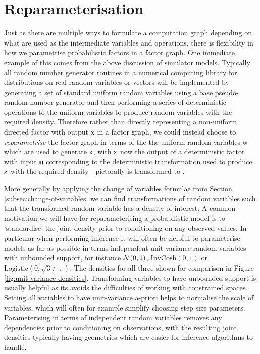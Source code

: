 \chapter{\mbox{Reparameterisation}}\label{ch:reparameterisation}

Just as there are multiple ways to formulate a computation graph depending on what are used as the intermediate variables and operations, there is flexibility in how we parametrise probabilistic factors in a factor graph. One immediate example of this comes from the above discussion of simulator models. Typically all random number generator routines in a numerical computing library for distributions on real random variables or vectors will be implemented by generating a set of standard uniform random variables using a base pseudo-random number generator and then performing a series of deterministic operations to the uniform variables to produce random variables with the required density. Therefore rather than directly representing a non-uniform directed factor with output $\mathsf{x}$ in a factor graph, we could instead choose to \emph{reparametrise} the factor graph in terms of the the uniform random variables $\boldsymbol{\mathsf{u}}$ which are used to generate $\mathsf{x}$, with $\mathsf{x}$ now the output of a deterministic factor with input $\boldsymbol{\mathsf{u}}$ corresponding to the deterministic transformation used to produce $\mathsf{x}$ with the required density - pictorally  is transformed to .

More generally by applying the change of variables formulae from Section \ref{subsec:change-of-variables} we can find transformations of random variables such that the transformed random variable has a density of interest.  A common motivation we will have for reparameterising a probabilistic model is to `standardise' the joint density prior to conditioning on any observed values. In particular when performing inference it will often be helpful to parameterise  models as far as possible in terms independent unit-variance random variables with unbounded support, for instance $\nrm{0,1}$, $\textrm{InvCosh}(0,1)$ or $\textrm{Logistic}(0,\sqrt{3}/\uppi)$. The densities for all three shown for comparison in Figure \ref{fig:unit-variance-densities}. Transforming variables to have unbounded support is usually helpful as its avoids the difficulties of working with constrained spaces. Setting all variables to have unit-variance a-priori helps to normalise the scale of variables, which will often for example simplify choosing step size parameters. Parameterising in terms of independent random variables removes any dependencies prior to conditioning on observations, with the resulting joint densities typically having geometries which are easier for inference algorithms to handle. 

